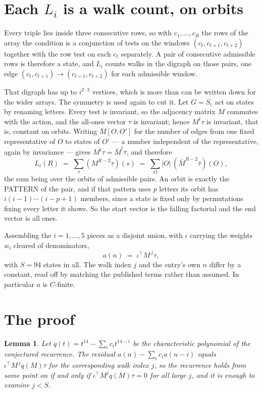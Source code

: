 \documentclass[11pt,a4paper]{article}
\theoremstyle{plain}
\newtheorem{lemma}[theorem]{Lemma}
\theoremstyle{definition}
\begin{document}
\section{Each $L_i$ is a walk count, on orbits}

Every triple lies inside three consecutive rows, so with $c_1,\dots,c_R$ the rows of the array
the condition is a conjunction of tests on the windows $(c_{t},c_{t+1},c_{t+2})$ together
with the row test on each $c_t$ separately. A pair of consecutive admissible rows is therefore
a state, and $L_i$ counts walks in the digraph on those pairs, one edge $(c_t,c_{t+1})\to
(c_{t+1},c_{t+2})$ for each admissible window.

That digraph has up to $i^{2\cdot3}$ vertices, which is more than can be written down for
the wider arrays. The symmetry is used again to cut it. Let $G=S_i$ act on states by renaming
letters. Every test is invariant, so the adjacency matrix $M$ commutes with the action, and the
all-ones vector $\tau$ is invariant; hence $M^{t}\tau$ is invariant, that is, constant on
orbits. Writing $\bar M[O,O']$ for the number of edges from one fixed representative of $O$ to
states of $O'$ --- a number independent of the representative, again by invariance --- gives
$\overline{M^{t}\tau}=\bar M^{t}\bar\tau$, and therefore
\[
L_i(R)\;=\;\sum_{s}(M^{R-2}\tau)(s)\;=\;\sum_{O}|O|\,(\bar M^{R-2}\bar\tau)(O),
\]
the sum being over the orbits of admissible pairs. An orbit is exactly the PATTERN of the pair,
and if that pattern uses $p$ letters its orbit has $i(i-1)\cdots(i-p+1)$ members, since a state
is fixed only by permutations fixing every letter it shows. So the start vector is the falling
factorial and the end vector is all ones.

Assembling the $i=1,\dots,5$ pieces as a disjoint union, with $\iota$ carrying the weights
$w_i$ cleared of denominators,
\[
a(n)\;=\;\iota^{\!\top}M^{\,j}\tau ,
\]
with $S=94$ states in all. The walk index $j$ and the entry's own $n$ differ by a constant,
read off by matching the published terms rather than assumed. In particular $a$ is $C$-finite.

\section{The proof}

\begin{lemma}\label{lem:crit}
Let $q(t)=t^{14}-\sum_i c_it^{14-i}$ be the characteristic polynomial of the
conjectured recurrence. The residual $a(n)-\sum_ic_ia(n-i)$ equals
$\iota^{\!\top}M^{\,j}q(M)\tau$ for the corresponding walk index $j$, so the recurrence
holds from some point on if and only if $\iota^{\!\top}M^{j}q(M)\tau=0$ for all large $j$,
and it is enough to examine $j<S$.
\end{lemma}
\end{document}
